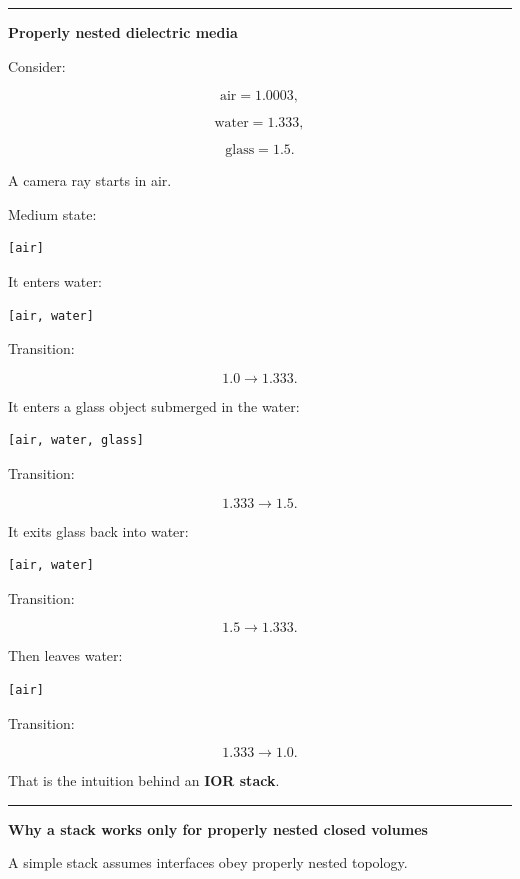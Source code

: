 \begin{center}\rule{0.5\linewidth}{0.5pt}\end{center}

\textbf{Properly nested dielectric media}

Consider:

\[
\text{air}=1.0003,
\]

\[
\text{water}=1.333,
\]

\[
\text{glass}=1.5.
\]

A camera ray starts in air.

Medium state:

\begin{verbatim}
[air]
\end{verbatim}

It enters water:

\begin{verbatim}
[air, water]
\end{verbatim}

Transition:

\[
1.0\rightarrow1.333.
\]

It enters a glass object submerged in the water:

\begin{verbatim}
[air, water, glass]
\end{verbatim}

Transition:

\[
1.333\rightarrow1.5.
\]

It exits glass back into water:

\begin{verbatim}
[air, water]
\end{verbatim}

Transition:

\[
1.5\rightarrow1.333.
\]

Then leaves water:

\begin{verbatim}
[air]
\end{verbatim}

Transition:

\[
1.333\rightarrow1.0.
\]

That is the intuition behind an \textbf{IOR stack}.

\begin{center}\rule{0.5\linewidth}{0.5pt}\end{center}

\textbf{Why a stack works only for properly nested closed volumes}

A simple stack assumes interfaces obey properly nested topology.

